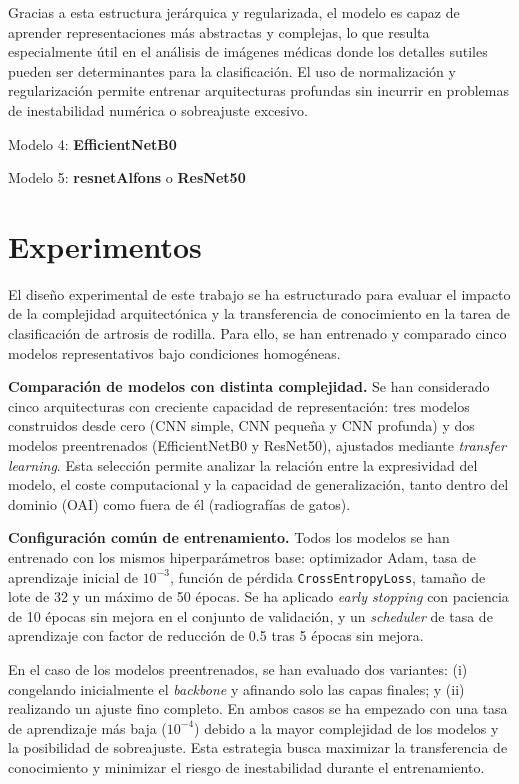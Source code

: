 \documentclass[11pt,spanish,listoffigures,listoftables]{tfgetsinf}
\begin{document}
Gracias a esta estructura jerárquica y regularizada, el modelo es capaz de aprender representaciones 
más abstractas y complejas, lo que resulta especialmente útil en el análisis de imágenes médicas donde 
los detalles sutiles pueden ser determinantes para la clasificación. El uso de normalización y regularización 
permite entrenar arquitecturas profundas sin incurrir en problemas de inestabilidad numérica o sobreajuste excesivo.


Modelo 4: \textbf{EfficientNetB0} 

Modelo 5: \textbf{resnetAlfons} o \textbf{ResNet50}

\section{Experimentos}

El diseño experimental de este trabajo se ha estructurado para evaluar el impacto de la complejidad arquitectónica y la transferencia de conocimiento 
en la tarea de clasificación de artrosis de rodilla. Para ello, se han entrenado y comparado cinco modelos representativos bajo condiciones homogéneas.

\textbf{Comparación de modelos con distinta complejidad.}
Se han considerado cinco arquitecturas con creciente capacidad de representación: tres modelos construidos desde cero (CNN simple, CNN pequeña y CNN profunda) 
y dos modelos preentrenados (EfficientNetB0 y ResNet50), ajustados mediante \textit{transfer learning}. Esta selección permite analizar la relación entre la 
expresividad del modelo, el coste computacional y la capacidad de generalización, tanto dentro del dominio (OAI) como fuera de él (radiografías de gatos).

\textbf{Configuración común de entrenamiento.}
Todos los modelos se han entrenado con los mismos hiperparámetros base: optimizador Adam, tasa de aprendizaje inicial de $10^{-3}$, función de pérdida
\texttt{CrossEntropyLoss}, tamaño de lote de 32 y un máximo de 50 épocas. Se ha aplicado \textit{early stopping} con paciencia de 10 épocas sin mejora 
en el conjunto de validación, y un \textit{scheduler} de tasa de aprendizaje con factor de reducción de 0.5 tras 5 épocas sin mejora.

En el caso de los modelos preentrenados, se han evaluado dos variantes: (i) congelando inicialmente el \textit{backbone} y afinando solo las capas finales; 
y (ii) realizando un ajuste fino completo. En ambos casos se ha empezado con una tasa de aprendizaje más baja ($10^{-4}$) debido a la mayor complejidad de
los modelos y la posibilidad de sobreajuste. Esta estrategia busca maximizar la transferencia de conocimiento y minimizar el riesgo de inestabilidad durante el
entrenamiento.
\end{document}
